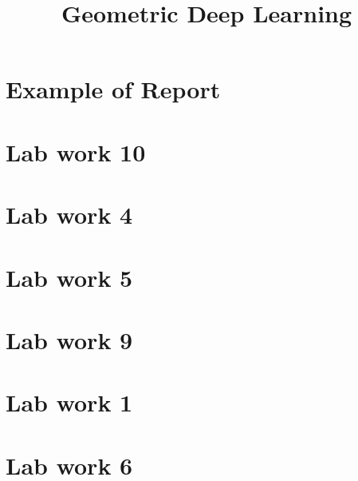 \documentclass[a4paper,14pt]{article}
\title{Geometric Deep Learning}
\date{}
\numberwithin{equation}{section}
\begin{document}
    \maketitle
    \tableofcontents

    \clearpage
    \section{Example of Report} %
    {} %

    \clearpage
    \section{Lab work 10} %
    {} %

    \clearpage
    \section{Lab work 4} %
    {} %

    \clearpage
    \section{Lab work 5} %
    {} %

    \clearpage
    \section{Lab work 9} %
    {} %

    \clearpage
    \section{Lab work 1} %
    {} %

    \clearpage
    \section{Lab work 6} %
    {} %

    \clearpage
    \printbibliography
\end{document}
